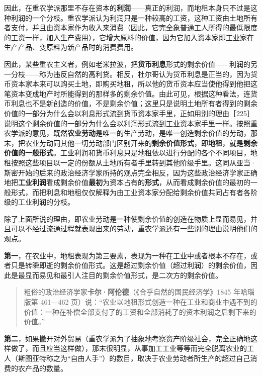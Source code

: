 因此，在重农学派那里不存在资本的\textbf{利润}——真正的利润，而地租本身只不过是这种利润的一个分枝。重农学派认为利润只是一种较高的工资，这种工资由土地所有者支付，并且由资本家作为收入来消费（因此，它完全象普通工人所得的最低限度的工资一样，加入生产费用），它增大原料的价值，因为它加入资本家即工业家在生产产品、变原料为新产品时的消费费用。

因此，某些重农主义者，例如老米拉波，把\textbf{货币利息}形式的剩余价值——利润的另一分枝——称为违反自然的高利贷。相反，杜尔哥认为货币利息是正当的，因为货币资本家本来可以购买土地，即购买地租，所以他的货币资本应当使他得到他把这笔资本变成地产时所能得到的那样多的剩余价值。由此可见，根据这种看法，连货币利息也不是新创造的价值，不是剩余价值；这里只是说明土地所有者得到的剩余价值的一部分为什么会以利息形式流到货币资本家手里，正如用别的理由［225］说明这个剩余价值的一部分为什么会以利润形式流到工业资本家手里一样。按照重农学派的意见，既然\textbf{农业劳动}是唯一的生产劳动，是唯一创造剩余价值的劳动，那末，把农业劳动同其他一切劳动部门区别开来的\textbf{剩余价值形式}，即\textbf{地租}，就是\textbf{剩余价值的一般形式}。工业利润和货币利息只是地租依以进行分配的各个不同项目，地租按照这些项目以一定的份额从土地所有者手里转到其他阶级手里。这同从亚当·斯密开始的后来的政治经济学家所持的观点完全相反，因为这些政治经济学家正确地把\textbf{工业利润}看成剩余价值\textbf{最初}为资本占有的\textbf{形式}，从而看成剩余价值的最初的一般形式，而把利息和地租仅仅解释为由工业资本家分配给剩余价值共同占有者各阶级的工业利润的分枝。

除了上面所说的理由，即农业劳动是一种使剩余价值的创造在物质上显而易见，并且可以不经过流通过程就表现出来的劳动，重农学派还有一些别的理由说明他们的观点。

\textbf{第一}，在农业中，地租表现为第三要素，表现为一种在工业中或者根本不存在，或者只是转瞬即逝的剩余价值形式。这是超过剩余价值（超过利润）的剩余价值，因此是最显而易见和最引人注目的剩余价值形式，是二次方的剩余价值。

\begin{quote}粗俗的政治经济学家\textbf{卡尔·阿伦德}（《合乎自然的国民经济学》1845 年哈瑙版第 461—462 页）说：“农业以地租形式创造一种在工业和商业中遇不到的价值：一种在补偿全部支付了的工资和全部消耗了的资本利润之后剩下来的价值。”\end{quote}

\textbf{第二}，如果撇开对外贸易（重农学派为了抽象地考察资产阶级社会，完全正确地这样做了，而且应当这样做），那末很明显，从事加工工业等等而完全脱离农业的工人（斯图亚特称之为“自由人手”）的数目，取决于农业劳动者所生产的超过自己消费的农产品的数量。

